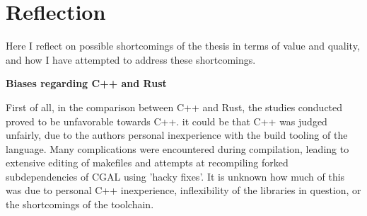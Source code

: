 






  

\section{Reflection}
\label{sec:reflection}

Here I reflect on possible shortcomings of the thesis in terms of value and quality, and how I have attempted to address these shortcomings. 

\textbf{Biases regarding C++ and Rust}

First of all, in the comparison between C++ and Rust, the studies conducted proved to be unfavorable towards C++. 
it could be that C++ was judged unfairly, due to the authors personal inexperience with the build tooling of the language. 
Many complications were encountered during compilation, leading to extensive editing of makefiles and attempts at recompiling forked subdependencies of CGAL using 'hacky fixes'.  
It is unknown how much of this was due to personal C++ inexperience, inflexibility of the libraries in question, or the shortcomings of the toolchain. 

